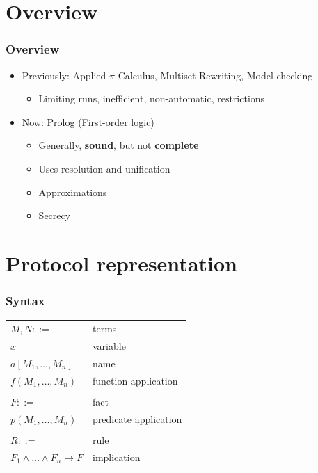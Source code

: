 \documentclass[10pt]{beamer}
\begin{document}
\section{Overview}

\begin{frame}
  \frametitle{Overview}
  \begin{itemize}
    \item Previously: Applied $\pi$ Calculus, Multiset Rewriting, Model checking
    \begin{itemize}
      \item Limiting runs, inefficient, non-automatic, restrictions
    \end{itemize}
    \item Now: Prolog (First-order logic)
    \begin{itemize}
      \item Generally, \textbf{sound}, but not \textbf{complete}
      \item Uses resolution and unification
      \item Approximations
      \item Secrecy
    \end{itemize}
  \end{itemize}
\end{frame}

\section{Protocol representation}

\newcommand{\mytab}{\hspace{0.05\textwidth}}

\begin{frame}
  \frametitle{Syntax}
  \centering

  {\setlength{\tabcolsep}{20pt}
    \begin{tabular}{ll}
      $M, N ::=$ & terms \\
      \mytab$x$ & \mytab variable \\
      \mytab$a[M_1, \dots, M_n]$ & \mytab name \\
      \mytab$f(M_1, \dots, M_n)$ & \mytab function application \\\\

      $F ::=$ & fact \\
      \mytab$p(M_1, \dots, M_n)$ & \mytab predicate application \\\\

      $R ::=$ & rule \\
      \mytab$F_1 \land \dots \land F_n \rightarrow F$ & \mytab implication
    \end{tabular}
  }
\end{frame}
\end{document}
